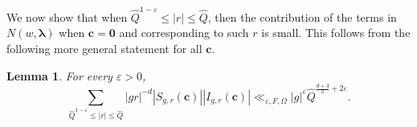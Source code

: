 \documentclass[10pt]{amsart}
\theoremstyle{plain}
\theoremstyle{plain}
\newtheorem{lemma}[theorem]{Lemma}
\renewcommand{\vec}[1]{\mathbf{#1}}
\theoremstyle{remark}
\theoremstyle{definition}
\renewcommand{\hat}{\widehat}
\newcommand{\Ki}{K_\infty}
\newcommand{\hQ}{\widehat{Q}}
\newcommand{\TT}{\mathbb{T}}
\newcommand{\vol}{\textup{vol}}
\begin{document}
We now show that when $\hQ^{1-\varepsilon}\leq |r|\leq\hQ$, then the contribution of the terms in $N(w,\boldsymbol{\lambda})$ when $\vec{c}=\vec{0}$ and corresponding to such $r$ is small. This follows from the following more general statement for all $\vec{c}$.
\begin{lemma}\label{lem:small}For every $\varepsilon>0$,
\[\sum_{\hQ^{1-\varepsilon}\leq |r|\leq\hQ}|gr|^{-d}|S_{g,r}(\vec{c})||I_{g,r}(\vec{c})|\ll_{\varepsilon,F,\Omega}|g|^{\varepsilon}\hQ^{\frac{d+3}{2}+2\varepsilon}.\]
\end{lemma}
\end{document}
